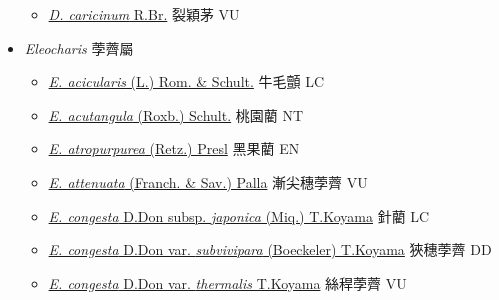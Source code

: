 \begin{itemize}
  \begin{itemize}
        \item[] \href{http://www.theplantlist.org/tpl1.1/search?q=Diplacrum+caricinum}{\textit{D. caricinum} R.Br.}   裂穎茅 VU
  \end{itemize}
 \item[] \textit{Eleocharis} 荸薺屬
                    
  \begin{itemize}
        \item[] \href{http://www.theplantlist.org/tpl1.1/search?q=Eleocharis+acicularis}{\textit{E. acicularis} (L.) Rom. \& Schult.}   牛毛顫 LC
        \item[] \href{http://www.theplantlist.org/tpl1.1/search?q=Eleocharis+acutangula}{\textit{E. acutangula} (Roxb.) Schult.}   桃園藺 NT
        \item[] \href{http://www.theplantlist.org/tpl1.1/search?q=Eleocharis+atropurpurea}{\textit{E. atropurpurea} (Retz.) Presl}   黑果藺 EN
        \item[] \href{http://www.theplantlist.org/tpl1.1/search?q=Eleocharis+attenuata}{\textit{E. attenuata} (Franch. \& Sav.) Palla}   漸尖穗荸薺 VU
        \item[] \href{http://www.theplantlist.org/tpl1.1/search?q=Eleocharis+congesta+subsp.+japonica}{\textit{E. congesta} D.Don subsp. \textit{japonica} (Miq.) T.Koyama}   針藺 LC
        \item[] \href{http://www.theplantlist.org/tpl1.1/search?q=Eleocharis+congesta+var.+subvivipara}{\textit{E. congesta} D.Don var. \textit{subvivipara} (Boeckeler) T.Koyama}   狹穗荸薺 DD
        \item[] \href{http://www.theplantlist.org/tpl1.1/search?q=Eleocharis+congesta+var.+thermalis}{\textit{E. congesta} D.Don var. \textit{thermalis} T.Koyama}   絲稈荸薺 VU

\end{itemize}
\end{itemize}
